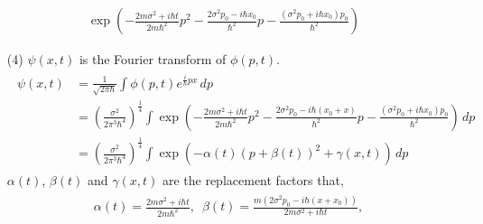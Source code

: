 \documentclass[floatfix,nofootinbib,superscriptaddress,fleqn]{revtex4}
\begin{document}
\begin{itemize}
\begin{align*}
      \exp\left(-\frac{2m\sigma^2+i\hbar t}{2m\hbar^2}p^2 
      -\frac{2\sigma^2p_0-i\hbar x_0}{\hbar^2}p
      -\frac{\left(\sigma^2p_0+i\hbar x_0\right)p_0}{\hbar^2} \right)
  \end{align*}
  \item[(4)] $\psi(x,t)$ is the Fourier transform of $\phi(p,t)$.
  \begin{align}
    \begin{split}
      \psi(x,t) &= \frac{1}{\sqrt{2\pi\hbar}}\int\phi(p,t)e^{\frac{i}{\hbar}px}\,dp  \\
      &={\left(\frac{\sigma^2}{2\pi^3\hbar^4}\right)}^{\frac{1}{4}}
      \int\exp\left(-\frac{2m\sigma^2+i\hbar t}{2m\hbar^2} p^2 
      -\frac{2\sigma^2p_0-i\hbar (x_0+x)}{\hbar^2}p
      -\frac{\left(\sigma^2p_0+i\hbar x_0\right)p_0}{\hbar^2}\right)\,dp  \\
      &={\left(\frac{\sigma^2}{2\pi^3\hbar^4}\right)}^{\frac{1}{4}}
      \int\exp{\left( -\alpha(t)\left(p+\beta(t)\right)^2+\gamma(x,t) \right)}\,dp
    \end{split}
  \end{align}
  $\alpha(t)$, $\beta(t)$ and $\gamma(x,t)$ are the replacement factors that,
  \begin{align}
    \begin{split}\label{eq:abg}
      &\alpha(t) =\frac{2m\sigma^2+i\hbar t}{2m\hbar^2},\,\,\,
    \beta(t) =\frac{m(2\sigma^2p_0-i\hbar(x+x_0))}{2m\sigma^2+i\hbar t},  \\

\end{split}
\end{align}
\end{itemize}
\end{document}
